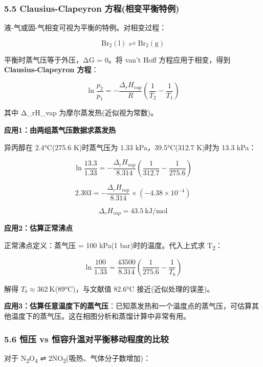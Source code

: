 \subsubsection{5.5 Clausius-Clapeyron 方程(相变平衡特例)}\label{clausius-clapeyron-ux65b9ux7a0bux76f8ux53d8ux5e73ux8861ux7279ux4f8b}

液-气或固-气相变可视为平衡的特例。对相变过程：

\[
\mathrm{Br_2(l) \rightleftharpoons Br_2(g)}
\]

平衡时蒸气压等于外压，ΔG = 0。将 van't Hoff 方程应用于相变，得到 \textbf{Clausius-Clapeyron 方程}：

\[
\boxed{\ln\frac{p_2}{p_1} = -\frac{\Delta_rH_{vap}}{R}\left(\frac{1}{T_2} - \frac{1}{T_1}\right)}
\]

其中 Δ\_rH\_vap 为摩尔蒸发热(近似视为常数)。

\textbf{应用1：由两组蒸气压数据求蒸发热}

异丙醇在 2.4°C(275.6 K)时蒸气压为 1.33 kPa，39.5°C(312.7 K)时为 13.3 kPa：

\[
\ln\frac{13.3}{1.33} = -\frac{\Delta_rH_{vap}}{8.314}\left(\frac{1}{312.7} - \frac{1}{275.6}\right)
\]

\[
2.303 = -\frac{\Delta_rH_{vap}}{8.314} \times (-4.38 \times 10^{-4})
\]

\[
\Delta_rH_{vap} = 43.5\ \mathrm{kJ/mol}
\]

\textbf{应用2：估算正常沸点}

正常沸点定义：蒸气压 = 100 kPa(1 bar)时的温度。代入上式求 T\textsubscript{2}：

\[
\ln\frac{100}{1.33} = \frac{43500}{8.314}\left(\frac{1}{275.6} - \frac{1}{T_b}\right)
\]

解得 \(T_b \approx 362\ \mathrm{K}\)(89°C)，与文献值 82.6°C 接近(近似处理的误差)。

\textbf{应用3：估算任意温度下的蒸气压}：已知蒸发热和一个温度点的蒸气压，可估算其他温度下的蒸气压。这在相图分析和蒸馏计算中非常有用。

\subsubsection{5.6 恒压 vs 恒容升温对平衡移动程度的比较}\label{ux6052ux538b-vs-ux6052ux5bb9ux5347ux6e29ux5bf9ux5e73ux8861ux79fbux52a8ux7a0bux5ea6ux7684ux6bd4ux8f83}

对于 N\textsubscript{2}O\textsubscript{4} ⇌ 2NO\textsubscript{2}(吸热、气体分子数增加)：

